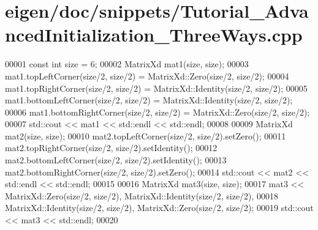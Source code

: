 \hypertarget{eigen_2doc_2snippets_2_tutorial___advanced_initialization___three_ways_8cpp_source}{}\section{eigen/doc/snippets/\+Tutorial\+\_\+\+Advanced\+Initialization\+\_\+\+Three\+Ways.cpp}
\label{eigen_2doc_2snippets_2_tutorial___advanced_initialization___three_ways_8cpp_source}

\begin{DoxyCode}
00001 \textcolor{keyword}{const} \textcolor{keywordtype}{int} size = 6;
00002 MatrixXd mat1(size, size);
00003 mat1.topLeftCorner(size/2, size/2)     = MatrixXd::Zero(size/2, size/2);
00004 mat1.topRightCorner(size/2, size/2)    = MatrixXd::Identity(size/2, size/2);
00005 mat1.bottomLeftCorner(size/2, size/2)  = MatrixXd::Identity(size/2, size/2);
00006 mat1.bottomRightCorner(size/2, size/2) = MatrixXd::Zero(size/2, size/2);
00007 std::cout << mat1 << std::endl << std::endl;
00008 
00009 MatrixXd mat2(size, size);
00010 mat2.topLeftCorner(size/2, size/2).setZero();
00011 mat2.topRightCorner(size/2, size/2).setIdentity();
00012 mat2.bottomLeftCorner(size/2, size/2).setIdentity();
00013 mat2.bottomRightCorner(size/2, size/2).setZero();
00014 std::cout << mat2 << std::endl << std::endl;
00015 
00016 MatrixXd mat3(size, size);
00017 mat3 << MatrixXd::Zero(size/2, size/2), MatrixXd::Identity(size/2, size/2),
00018         MatrixXd::Identity(size/2, size/2), MatrixXd::Zero(size/2, size/2);
00019 std::cout << mat3 << std::endl;
00020 
\end{DoxyCode}
